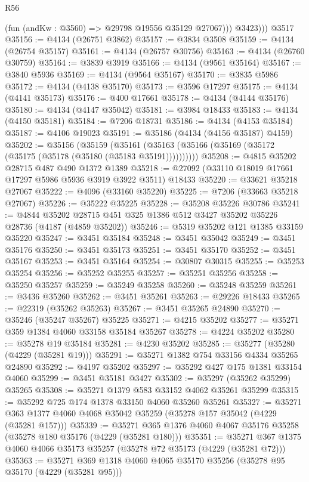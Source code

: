 \begin{lexlean}{R56}
\begin{coremodule}
            (fun (andKw : @3560) => @29798 @19556 @35129 @27067)))
          @3423)))
    @3517
@35156 := @4134 (@26751 @3862)
@35157 := @3834 @3508
@35159 := @4134 (@26754 @35157)
@35161 := @4134 (@26757 @30756)
@35163 := @4134 (@26760 @30759)
@35164 := @3839 @3919
@35166 := @4134 (@9561 @35164)
@35167 := @3840 @5936
@35169 := @4134 (@9564 @35167)
@35170 := @3835 @5986
@35172 := @4134 (@4138 @35170)
@35173 := @3596 @17297
@35175 := @4134 (@4141 @35173)
@35176 := @400 @17661
@35178 := @4134 (@4144 @35176)
@35180 := @4134 (@4147 @35042)
@35181 := @3984 @18433
@35183 := @4134 (@4150 @35181)
@35184 := @7206 @18731
@35186 := @4134 (@4153 @35184)
@35187 := @4106 @19023
@35191 := @35186 (@4134 (@4156 @35187) @4159)
@35202 := @35156
    (@35159 (@35161 (@35163 (@35166 (@35169 (@35172 (@35175 (@35178 (@35180 (@35183 @35191))))))))))
@35208 := @4815 @35202 @28715 @487 @490 @1372 @1389
@35218 := @27092 (@33110 @18019 @17661 @17297 @5986 @5936 @3919 @3922 @3511) @18433
@35220 := @33621 @35218 @27067
@35222 := @4096 (@33160 @35220)
@35225 := @7206 (@33663 @35218 @27067)
@35226 := @35222 @35225
@35228 := @35208 @35226 @30786
@35241 := @4844 @35202 @28715 @451 @325 @1386 @512 @3427 @35202 @35226 @28736 (@4187 (@4859 @35202))
@35246 := @5319 @35202 @121 @1385 @33159 @35220
@35247 := @3451 @35184
@35248 := @3451 @35042
@35249 := @3451 @35176
@35250 := @3451 @35173
@35251 := @3451 @35170
@35252 := @3451 @35167
@35253 := @3451 @35164
@35254 := @30807 @30315
@35255 := @35253 @35254
@35256 := @35252 @35255
@35257 := @35251 @35256
@35258 := @35250 @35257
@35259 := @35249 @35258
@35260 := @35248 @35259
@35261 := @3436 @35260
@35262 := @3451 @35261
@35263 := @29226 @18433
@35265 := @22319 (@35262 @35263)
@35267 := @3451 @35265 @24890
@35270 := @35246 (@35247 @35267) @35225
@35271 := @4215 @35202
@35277 := @35271 @359 @1384 @4060 @33158 @35184 @35267
@35278 := @4224 @35202
@35280 := @35278 @19 @35184
@35281 := @4230 @35202
@35285 := @35277 (@35280 (@4229 (@35281 @19)))
@35291 := @35271 @1382 @754 @33156 @4334 @35265 @24890
@35292 := @4197 @35202
@35297 := @35292 @427 @175 @1381 @33154 @4060
@35299 := @3451 @35181 @3427
@35302 := @35297 (@35262 @35299) @35265
@35308 := @35271 @1379 @583 @33152 @4062 @35261 @35299
@35315 := @35292 @725 @174 @1378 @33150 @4060 @35260 @35261
@35327 := @35271 @363 @1377 @4060 @4068 @35042 @35259 (@35278 @157 @35042 (@4229 (@35281 @157)))
@35339 := @35271 @365 @1376 @4060 @4067 @35176 @35258 (@35278 @180 @35176 (@4229 (@35281 @180)))
@35351 := @35271 @367 @1375 @4060 @4066 @35173 @35257 (@35278 @72 @35173 (@4229 (@35281 @72)))
@35363 := @35271 @369 @1318 @4060 @4065 @35170 @35256 (@35278 @95 @35170 (@4229 (@35281 @95)))

\end{coremodule}
\end{lexlean}
